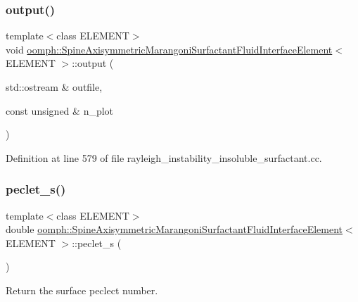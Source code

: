 \subsubsection{\texorpdfstring{output()}{output()}}
{\footnotesize\ttfamily template$<$class E\+L\+E\+M\+E\+NT$>$ \\
void \hyperlink{classoomph_1_1SpineAxisymmetricMarangoniSurfactantFluidInterfaceElement}{oomph\+::\+Spine\+Axisymmetric\+Marangoni\+Surfactant\+Fluid\+Interface\+Element}$<$ E\+L\+E\+M\+E\+NT $>$\+::output (\begin{DoxyParamCaption}\item[{std\+::ostream \&}]{outfile,  }\item[{const unsigned \&}]{n\+\_\+plot }\end{DoxyParamCaption})\hspace{0.3cm}{\ttfamily [inline]}}



Definition at line 579 of file rayleigh\+\_\+instability\+\_\+insoluble\+\_\+surfactant.\+cc.

\mbox{\label{classoomph_1_1SpineAxisymmetricMarangoniSurfactantFluidInterfaceElement_a6a927de4f0ec496fce8114f5710f1db2}} 
\subsubsection{\texorpdfstring{peclet\+\_\+s()}{peclet\_s()}}
{\footnotesize\ttfamily template$<$class E\+L\+E\+M\+E\+NT$>$ \\
double \hyperlink{classoomph_1_1SpineAxisymmetricMarangoniSurfactantFluidInterfaceElement}{oomph\+::\+Spine\+Axisymmetric\+Marangoni\+Surfactant\+Fluid\+Interface\+Element}$<$ E\+L\+E\+M\+E\+NT $>$\+::peclet\+\_\+s (\begin{DoxyParamCaption}{ }\end{DoxyParamCaption})\hspace{0.3cm}{\ttfamily [inline]}}



Return the surface peclect number. 



